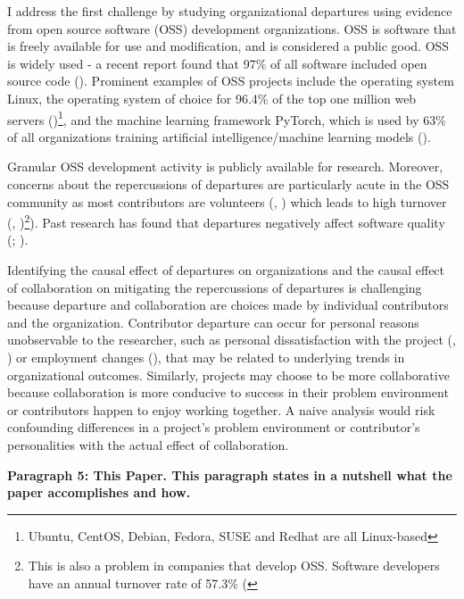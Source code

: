\documentclass[12pt,notitlepage]{article}
\begin{document}
I address the first challenge by studying organizational departures using evidence from open source software (OSS) development organizations. OSS is software that is freely available for use and modification, and is considered a public good. OSS is widely used - a recent report found that 97\% of all software included open source code (\cite{fred_bals_six_2025}). Prominent examples of OSS projects include the operating system Linux, the operating system of choice for 96.4\% of the top one million web servers (\cite{w3cook_os_2015})\footnote{Ubuntu, CentOS, Debian, Fedora, SUSE and Redhat are all Linux-based}, and the machine learning framework PyTorch, which is used by 63\% of all organizations training artificial intelligence/machine learning models (\cite{lawson_shaping_2024}). 

Granular OSS development activity is publicly available for research. Moreover, concerns about the repercussions of departures are particularly acute in the OSS community as most contributors are volunteers (\cite{robles_evolution_2005}, \cite{xu_volunteers_2010}) which leads to high turnover (\cite{izquierdo-cortazar_using_2009}, \cite{rashid_systematic_2019})\footnote{This is also a problem in companies that develop OSS. Software developers have an annual turnover rate of 57.3\% (\cite{terlecki_employee_2025}}). Past research has found that departures negatively affect software quality (\cite{mockus_organizational_2010}; \cite{foucault_impact_2015}).

Identifying the causal effect of departures on organizations and the causal effect of collaboration on mitigating the repercussions of departures is challenging because departure and collaboration are choices made by individual contributors and the organization. Contributor departure can occur for personal reasons unobservable to the researcher, such as personal dissatisfaction with the project (\cite{hannon_retaining_2008}, \cite{yu_empirical_2012}) or employment changes (\cite{miller_why_2019}), that may be related to underlying trends in organizational outcomes. Similarly, projects may choose to be more collaborative because collaboration is more conducive to success in their problem environment or contributors happen to enjoy working together. A naive analysis would risk confounding differences in a project's problem environment or  contributor's personalities with the actual effect of collaboration. 

\textbf{Paragraph 5: This Paper. This paragraph states in a nutshell what the paper accomplishes and how. }
\end{document}
